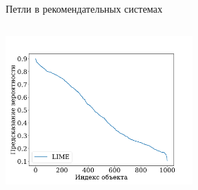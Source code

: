 \documentclass{beamer}
\begin{document}
\begin{frame}{Петли в рекомендательных системах}
\begin{columns}[c]
\includegraphics[width=7cm]{../figures/lime_proba.svg}
\end{columns}
\end{frame}
\end{document}
